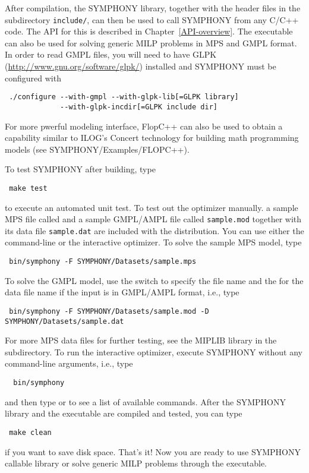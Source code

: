 After compilation, the SYMPHONY library, together with the header files in the
subdirectory {\color{Brown}\texttt{include/}}, can then be used to call
SYMPHONY from any C/C++ code. The API for this is described in
Chapter~\ref{API-overview}. The executable can also be used for solving
generic MILP problems in MPS and GMPL format. In order to read GMPL files, you
will need to have GLPK (\url{http://www.gnu.org/software/glpk/}) installed and
SYMPHONY must be configured with {\color{Brown}
\begin{verbatim}
 ./configure --with-gmpl --with-glpk-lib[=GLPK library] 
             --with-glpk-incdir[=GLPK include dir] 
\end{verbatim}
}
For more pwerful modeling interface, FlopC++ can also be used to obtain a
capability similar to ILOG's Concert technology for building math programming
models (see SYMPHONY/Examples/FLOPC++). 

To test SYMPHONY after building, type
{\color{Brown}
\begin{verbatim}
 make test
\end{verbatim}
} to execute an automated unit test. To test out the optimizer manually. a
sample MPS file called  and a sample GMPL/AMPL file called
{\color{Brown}\texttt{sample.mod}} together with its data file
{\color{Brown}\texttt{sample.dat}} are included with the distribution. You can
use either the command-line or the interactive optimizer. To solve the sample
MPS model, type {\color{Brown}
\begin{verbatim}
 bin/symphony -F SYMPHONY/Datasets/sample.mps
\end{verbatim}
} To solve the GMPL model, use the  switch to specify the file name
and the  for the data file name if the input is in GMPL/AMPL format,
i.e., type 
{\color{Brown}
\begin{verbatim}
 bin/symphony -F SYMPHONY/Datasets/sample.mod -D SYMPHONY/Datasets/sample.dat
\end{verbatim}}
For more MPS data files for further testing, see the MIPLIB library in the
 subdirectory. To run the interactive optimizer, execute SYMPHONY
without any command-line arguments, i.e., type
{\color{Brown}
\begin{verbatim}
  bin/symphony 
\end{verbatim}}
and then type  or  to see a list of available commands.
After the SYMPHONY library and the executable are compiled and tested, you
can type
{\color{Brown}
\begin{verbatim}
 make clean 
\end{verbatim}}
if you want to save disk space. That's it! Now you are ready to use SYMPHONY
callable library or solve generic MILP problems through the executable.

